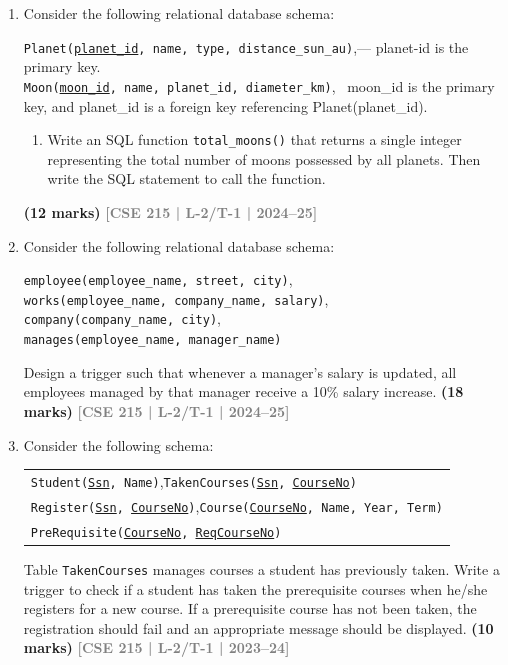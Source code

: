 \documentclass[12pt]{article}
\newcommand{\yr}[1]{\hfill\textcolor{gray}{\small\textbf{[#1]}}}
\newcommand{\mk}[1]{\textcolor{orange!70!black}{\small\textbf{(#1 marks)}}}
\begin{document}
\begin{enumerate}

    \item Consider the following relational database schema:
\begin{center}
\texttt{Planet(\underline{planet\_id}, name, type, distance\_sun\_au)},\quad --- planet-id is the primary key.
\\ \texttt{Moon(\underline{moon\_id}, name, planet\_id, diameter\_km)}, \ moon_id is the primary key, and planet_id is a foreign key referencing Planet(planet_id). 
\end{center}
\begin{enumerate}
  \item Write an SQL function \texttt{total\_moons()} that returns a single integer representing the total number of moons possessed by all planets. Then write the SQL statement to call the function.
\end{enumerate}
\mk{12} \yr{CSE 215 | L-2/T-1 | 2024--25}




    \item Consider the following relational database schema:
\begin{center}
\texttt{employee(employee\_name, street, city)},\quad \\\texttt{works(employee\_name, company\_name, salary)},\\
\texttt{company(company\_name, city)},\quad \\\texttt{manages(employee\_name, manager\_name)}
\end{center}
  Design a trigger such that whenever a manager's salary is updated, all employees managed by that manager receive a 10\% salary increase.
\mk{18} \yr{CSE 215 | L-2/T-1 | 2024--25}



\item Consider the following schema:
\begin{center}
\begin{tabular}{l}
\texttt{Student(\underline{Ssn}, Name)},\quad \texttt{TakenCourses(\underline{Ssn}, \underline{CourseNo})}\\
\texttt{Register(\underline{Ssn}, \underline{CourseNo})},\quad \texttt{Course(\underline{CourseNo}, Name, Year, Term)}\\
\texttt{PreRequisite(\underline{CourseNo}, \underline{ReqCourseNo})}
\end{tabular}
\end{center}
Table \texttt{TakenCourses} manages courses a student has previously taken. Write a trigger to check if a student has taken the prerequisite courses when he/she registers for a new course. If a prerequisite course has not been taken, the registration should fail and an appropriate message should be displayed.
\mk{10} \yr{CSE 215 | L-2/T-1 | 2023--24}



\end{enumerate}
\end{document}
